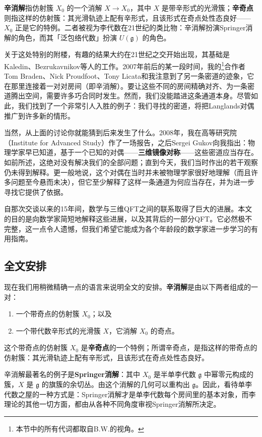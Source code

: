\begin{yizhu}[辛消解与辛奇点]
\textbf{辛消解}指仿射簇 $X_0$ 的一个消解 $X\to X_0$，其中 $X$ 是带辛形式的光滑簇；\textbf{辛奇点}则指这样的仿射簇：其光滑轨迹上配有辛形式，且该形式在奇点处性态良好——$X_0$ 正是它的特例。二者被视为李代数在21世纪的类比物：辛消解扮演Springer消解的角色，而其「泛包络代数」扮演 $U(\mathfrak{g})$ 的角色。
\end{yizhu}

关于这处特别的附楼，有趣的结果大约在21世纪之交开始出现，其基础是Kaledin、Bezrukavnikov等人的工作。2007年前后的某一段时间，我的\footnote{本节中的所有代词都取自B.W.的视角。}合作者Tom Braden、Nick Proudfoot、Tony Licata和我注意到了另一条密道的迹象，它在那里连接着一对对房间（即辛消解）。要让这些不同的房间精确对齐、为一条密道腾出空间，需要许多巧合同时发生。然而，我们没能踏进这条通道本身。尽管如此，我们找到了一个非常引人入胜的例子：我们寻找的密道，将把Langlands对偶推广到许多新的情形。

当然，从上面的讨论你就能猜到后来发生了什么。2008年，我在高等研究院（Institute for Advanced Study）作了一场报告，之后Sergei Gukov向我指出：物理学家早已知道，基于一个已知的对偶——\textbf{三维镜像对称}——这些密道应当存在。如前所述，这绝对没有解决我们的全部问题；直到今天，我们当时作出的若干观察仍未得到解释。更一般地说，这个对偶在当时并未被物理学家很好地理解（而且许多问题至今悬而未决），但它至少解释了这样一条通道为何应当存在，并为进一步寻找它提供了依据。

自那次交谈以来的15年间，数学与三维QFT之间的联系取得了巨大的进展。本文的目的是向数学家简短地解释这些进展，以及其背后的一部分QFT。它必然极不完整，这一点令人遗憾，但我们希望它能成为各个年龄段的数学家进一步学习的有用指南。

\subsection{全文安排}

现在我们用稍微精确一点的语言来说明全文的安排。\textbf{辛消解}是由以下两者组成的一对：
\begin{enumerate}
    \item 一个带奇点的仿射簇 $X_0$；以及
    \item 一个带代数辛形式的光滑簇 $X$，它消解 $X_0$ 的奇点。
\end{enumerate}
这个带奇点的仿射簇 $X_0$ 是\textbf{辛奇点}的一个特例；所谓辛奇点，是指这样的带奇点的仿射簇：其光滑轨迹上配有辛形式，且该形式在奇点处性态良好。

辛消解最著名的例子是\textbf{Springer消解}：其中 $X_0$ 是半单李代数 $\mathfrak{g}$ 中幂零元构成的簇，$X$ 是 $\mathfrak{g}$ 的旗簇的余切丛。由这个消解的几何可以重构出 $\mathfrak{g}$。因此，看待单李代数之屋的一种方式是：Springer消解才是单李代数每个房间里的基本对象，而李理论的其他一切方面，都由从各种不同角度审视Springer消解所决定。

